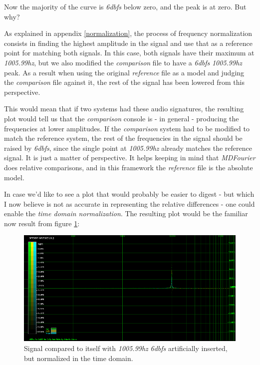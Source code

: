 \documentclass[10pt,a4paper]{report}
\newcommand{\fhz}[1]{\textit{#1\acrshort{hz}}}
\newcommand{\db}[1]{\textit{#1\acrshort{dbfs}}}
\begin{document}
\begin{appendices}
Now the majority of the curve is \db{6} below zero, and the peak is at zero. But  why?

As explained in appendix \ref{normalization}, the process of frequency normalization consists in finding the highest amplitude in the signal and use that as a reference point for matching both signals. In this case, both signals have their maximum at \fhz{1005.99}, but we also modified the \textit{comparison} file to have a \db{6} \fhz{1005.99} peak. As a result when using the original \textit{reference} file as a model and judging the \textit{comparison} file against it, the rest of the signal has been lowered from this perspective.

This would mean that if two systems had these audio signatures, the resulting plot would tell us that the \textit{comparison} console is - in general - producing the frequencies at lower amplitudes. If the \textit{comparison} system had to be modified to match the reference system, the rest of the frequencies in the signal should be raised by \db{6}, since the single point at \fhz{1005.99} already matches the reference signal. It is just a matter of perspective. It helps keeping in mind that \textit{MDFourier} does relative comparisons, and in this framework the \textit{reference} file is the absolute model.

In case we'd like to see a plot that would probably be easier to digest - but which I now believe is not as accurate in representing the relative differences - one could enable the \textit{time domain normalization}. The resulting plot would be the familiar now result from figure \ref{fig:corner3}:

\begin{figure}[H]
	\centering
	\includegraphics[width=1.0\linewidth]{images/corner/plot3.png}
	\caption[Corner Case 3]{Signal compared to itself with \fhz{1005.99} \db{6} artificially inserted, but normalized in the time domain.}
	\label{fig:corner3}
\end{figure}


\end{appendices}
\end{document}
